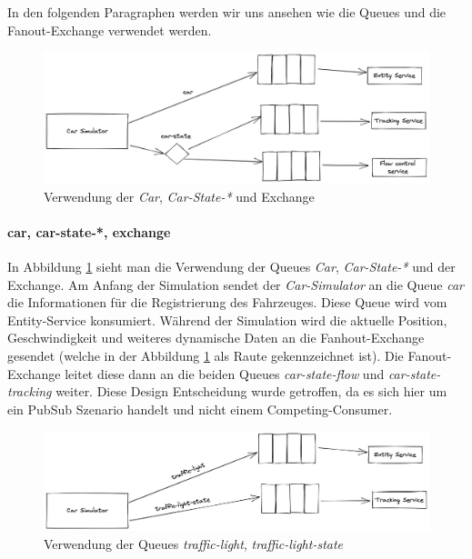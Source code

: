 In den folgenden Paragraphen werden wir uns ansehen wie die Queues und die Fanout-Exchange verwendet werden.

\begin{figure}[h]
	\centering
	\includegraphics[width=1\textwidth]{./figures/car_simulator_mom.png}
	\caption{Verwendung der \textit{Car}, \textit{Car-State-*} und Exchange}
	\label{fig:car_simulator_mom}
\end{figure}

\paragraph{car, car-state-*, exchange}
In Abbildung \ref{fig:car_simulator_mom} sieht man die Verwendung der Queues \textit{Car}, \textit{Car-State-*} und der Exchange. Am Anfang der Simulation sendet der \textit{Car-Simulator} an die Queue \textit{car} die Informationen für die Registrierung des Fahrzeuges. Diese Queue wird vom Entity-Service konsumiert. Während der Simulation wird die aktuelle Position, Geschwindigkeit und weiteres dynamische Daten an die Fanhout-Exchange gesendet (welche in der Abbildung \ref{fig:car_simulator_mom} als Raute gekennzeichnet ist). Die Fanout-Exchange leitet diese dann an die beiden Queues \textit{car-state-flow} und \textit{car-state-tracking} weiter. Diese Design Entscheidung wurde getroffen, da es sich hier um ein PubSub Szenario handelt und nicht einem Competing-Consumer.

\begin{figure}[h]
	\centering
	\includegraphics[width=1\textwidth]{./figures/traffic-light_simulator_mom.png}
	\caption{Verwendung der Queues \textit{traffic-light}, \textit{traffic-light-state} }
	\label{fig:light_simulator_mom}
\end{figure}

